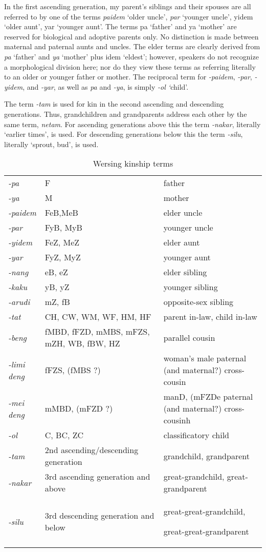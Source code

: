 In the first ascending generation, my parent's siblings and their spouses are all referred to by one of the terms \textit{paidem} `older uncle', \textit{par} `younger uncle', yidem `older aunt', yar `younger aunt'. The terms pa `father' and ya `mother' are reserved for biological and adoptive parents only. No distinction is made between maternal and paternal aunts and uncles. The elder terms are clearly derived from \textit{pa} `father' and \textit{ya} `mother' plus idem `eldest'; however, speakers do not recognize a morphological division here; nor do they view these terms as referring literally to an older or younger father or mother. The reciprocal term for \textit{{}-paidem}, \textit{{}-par}, \textit{{}-yidem}, and \textit{{}-yar}, as well as \textit{pa} and \textit{{}-ya}, is simply \textit{{}-ol `}child'.

The term \textit{{}-tam} is used for kin in the second ascending and descending generations. Thus, grandchildren and grandparents address each other by the same term, \textit{netam}. For ascending generations above this the term \textit{{}-nakar}, literally `earlier times', is used. For descending generations below this the term \textit{{}-silu}, literally `sprout, bud', is used.


\begin{table}\centering
\begin{tabular}{p{3cm}p{3cm}p{5cm}}
\textit{{}-pa} & F & father\\
\textit{{}-ya} & M & mother\\
\textit{{}-paidem} & FeB,MeB & elder uncle\\
\textit{{}-par} & FyB, MyB & younger uncle\\
\textit{{}-yidem} & FeZ, MeZ & elder aunt\\
\textit{{}-yar} & FyZ, MyZ & younger aunt\\
\textit{{}-nang} & eB, eZ & elder sibling\\
\textit{{}-kaku} & yB, yZ & younger sibling\\
\textit{{}-arudi} & mZ, fB & opposite-sex sibling\\
\textit{{}-tat} & CH, CW, WM, WF, HM, HF & parent in-law, child in-law\\
\textit{{}-beng} & fMBD, fFZD, mMBS, mFZS, mZH, WB, fBW, HZ & parallel cousin\\
\textit{{}-limi deng} & fFZS, (fMBS ?) & woman's male paternal (and maternal?) cross-cousin\\
\textit{{}-mei deng} & mMBD, (mFZD ?) & manD, (mFZDe paternal (and maternal?) cross-cousinh\\
\textit{{}-ol} & C, BC, ZC & classificatory child\\
\textit{{}-tam} & 2nd ascending/descending generation & grandchild, grandparent\\
\textit{{}-nakar} & 3rd ascending generation and above & great-grandchild, great-grandparent\\
\textit{{}-silu} & 3rd descending generation and below & great-great-grandchild,

great-great-grandparent\\
\end{tabular}
\caption{Wersing kinship terms}
\end{table}

